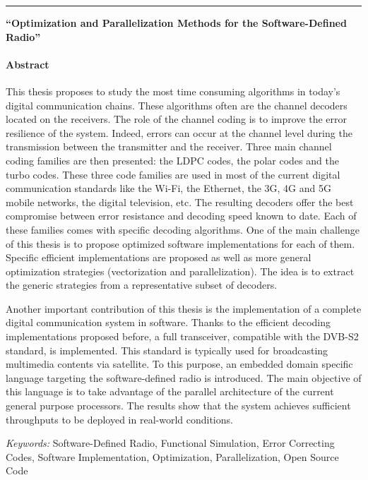 \documentclass[a4paper, 11pt]{article}
\begin{document}
\vskip0.5cm
{\color{bleuUni}\hrule}
\vskip0.5cm


\noindent
{\large \textbf{``Optimization and Parallelization Methods for the
                Software-Defined Radio''}}

\paragraph{Abstract}

This thesis proposes to study the most time consuming algorithms in today's
digital communication chains. These algorithms often are the channel decoders
located on the receivers. The role of the channel coding is to improve the error
resilience of the system. Indeed, errors can occur at the channel level during
the transmission between the transmitter and the receiver. Three main channel
coding families are then presented: the LDPC codes, the polar codes and the
turbo codes. These three code families are used in most of the current digital
communication standards like the Wi-Fi, the Ethernet, the 3G, 4G and 5G mobile
networks, the digital television, etc. The resulting decoders offer the best
compromise between error resistance and decoding speed known to date. Each of
these families comes with specific decoding algorithms. One of the main
challenge of this thesis is to propose optimized software implementations for
each of them. Specific efficient implementations are proposed as well as more
general optimization strategies (vectorization and parallelization). The idea is
to extract the generic strategies from a representative subset of decoders.

Another important contribution of this thesis is the implementation of a
complete digital communication system in software. Thanks to the efficient
decoding implementations proposed before, a full transceiver, compatible with
the DVB-S2 standard, is implemented. This standard is typically used for
broadcasting multimedia contents via satellite. To this purpose, an embedded
domain specific language targeting the software-defined radio is introduced. The
main objective of this language is to take advantage of the parallel
architecture of the current general purpose processors. The results show that
the system achieves sufficient throughputs to be deployed in real-world
conditions.

\vskip0.5cm
\emph{Keywords:} Software-Defined Radio, Functional Simulation, Error
                 Correcting Codes, Software Implementation, Optimization,
                 Parallelization, Open Source Code
\end{document}
